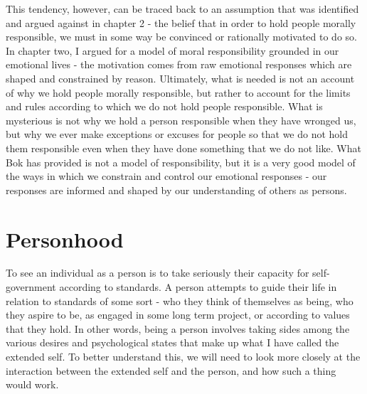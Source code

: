 \documentclass[phd,12pt,oneside,paper=letterpaper]{ubcthesis}
\begin{document}
This tendency, however, can be traced back to an assumption that was identified and argued against in chapter 2 - the belief that in order to hold people morally responsible, we must in some way be convinced or rationally motivated to do so. In chapter two, I argued for a model of moral responsibility grounded in our emotional lives - the motivation comes from raw emotional responses which are shaped and constrained by reason. Ultimately, what is needed is not an account of why we hold people morally responsible, but rather to account for the limits and rules according to which we do not hold people responsible. What is mysterious is not why we hold a person responsible when they have wronged us, but why we ever make exceptions or excuses for people so that we do not hold them responsible even when they have done something that we do not like. What Bok has provided is not a model of responsibility, but it is a very good model of the ways in which we constrain and control our emotional responses - our responses are informed and shaped by our understanding of others as persons.

\section{Personhood}
To see an individual as a person is to take seriously their capacity for self-government according to standards. A person attempts to guide their life in relation to standards of some sort - who they think of themselves as being, who they aspire to be, as engaged in some long term project, or according to values that they hold. In other words, being a person involves taking sides among the various desires and psychological states that make up what I have called the extended self. To better understand this, we will need to look more closely at the interaction between the extended self and the person, and how such a thing would work. 
\end{document}
